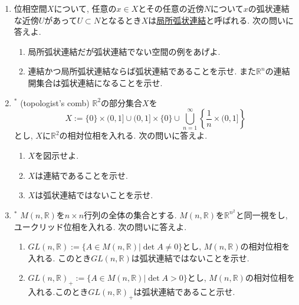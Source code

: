 \documentclass[dvipdfmx,a4paper,11pt]{article}
\newcommand{\R}{\mathbb{R}}
\theoremstyle{definition}
\newcommand{\pdrv}[2]{\frac{\partial #1}{\partial #2}}
\begin{document}
\begin{enumerate}[label=\textbf{問}\ref*{sec-connected}.\arabic*]
\item 位相空間$X$について, 任意の$x \in X$とその任意の近傍$N$について$x$の弧状連結な近傍$U$があって$U \subset N$となるとき$X$は\underline{局所弧状連結}と呼ばれる. 次の問いに答えよ.
	\begin{enumerate}
	\setlength{\parskip}{0cm} 
  \setlength{\itemsep}{0pt} 
	\item 局所弧状連結だが弧状連結でない空間の例をあげよ.
	\item 連結かつ局所弧状連結ならば弧状連結であることを示せ. また$\R^n$の連結開集合は弧状連結になることを示せ. 
	\end{enumerate}
\item $^{*}$ (topologist's comb) $\R^2$の部分集合$X$を
$$
X := \{ 0\} \times (0,1] \cup (0,1] \times \{ 0 \} \cup \bigcup_{n=1}^{\infty}\left\{ \frac{1}{n} \times (0,1] \right\}
$$
とし, $X$に$\R^2$の相対位相を入れる. 次の問いに答えよ. 
	\begin{enumerate}
	\setlength{\parskip}{0cm} 
  \setlength{\itemsep}{0pt} 
  \item $X$を図示せよ. 
  \item $X$は連結であることを示せ.
  \item $X$は弧状連結ではないことを示せ. %
  	\end{enumerate}



\item $^{*}$ $M(n,\R)$を$n\times n$行列の全体の集合とする.  $M(n,\R)$を$\R^{n^2}$と同一視をし, ユークリッド位相を入れる. 次の問いに答えよ.
	\begin{enumerate}
		\setlength{\parskip}{0cm} 
  \setlength{\itemsep}{0pt} 
	\item $GL(n, \R):= \{ A \in M(n,\R) | \det A \neq 0\}$とし, $M(n,\R)$の相対位相を入れる. このとき$GL(n, \R)$は弧状連結ではないことを示せ.
	\item $GL(n, \R)_{+}:=\{ A \in M(n,\R) | \det A > 0\}$とし, $M(n,\R)$の相対位相を入れる.このとき$GL(n, \R)_{+}$は弧状連結であること示せ.
	\end{enumerate}


\end{enumerate}
\end{document}
